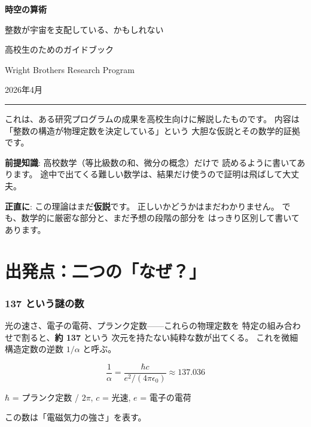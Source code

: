 \documentclass[11pt,a4paper]{article}
\begin{document}
\begin{center}
{\Huge\bfseries 時空の算術}

\bigskip

{\Large 整数が宇宙を支配している、かもしれない}

\bigskip

{\large 高校生のためのガイドブック}

\bigskip

{\large Wright Brothers Research Program}

\medskip

2026年4月

\bigskip

\rule{12cm}{0.4pt}
\end{center}

\vspace{1cm}

\begin{storybox}[このガイドについて]
これは、ある研究プログラムの成果を高校生向けに解説したものです。
内容は「整数の構造が物理定数を決定している」という
大胆な仮説とその数学的証拠です。

\textbf{前提知識}: 高校数学（等比級数の和、微分の概念）だけで
読めるように書いてあります。
途中で出てくる難しい数学は、結果だけ使うので証明は飛ばして大丈夫。

\textbf{正直に}: この理論はまだ\textbf{仮説}です。
正しいかどうかはまだわかりません。
でも、数学的に厳密な部分と、まだ予想の段階の部分を
はっきり区別して書いてあります。
\end{storybox}

\tableofcontents
\newpage

\part{出発点：二つの「なぜ？」}

\section{137 という謎の数}

光の速さ、電子の電荷、プランク定数——これらの物理定数を
特定の組み合わせで割ると、\textbf{約 137} という
次元を持たない純粋な数が出てくる。
これを微細構造定数の逆数 $1/\alpha$ と呼ぶ。

\begin{mathbox}[微細構造定数]
$$\frac{1}{\alpha} = \frac{\hbar c}{e^2/(4\pi\epsilon_0)} \approx 137.036$$

$\hbar$ = プランク定数 / $2\pi$,\quad
$c$ = 光速,\quad
$e$ = 電子の電荷

この数は「電磁気力の強さ」を表す。
\end{mathbox}
\end{document}
